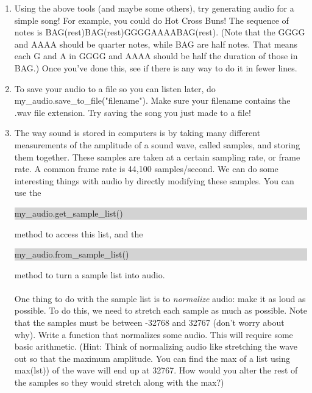\documentclass[11pt, letterpaper, onecolumn, oneside, final]{article}
\begin{document}
\begin{enumerate}
\item Using the above tools (and maybe some others), try generating audio for a simple song! For example, you could do Hot Cross Buns! The sequence of notes is BAG(rest)BAG(rest)GGGGAAAABAG(rest). (Note that the GGGG and AAAA should be quarter notes, while BAG are half notes. That means each G and A in GGGG and AAAA should be half the duration of those in BAG.) Once you've done this, see if there is any way to do it in fewer lines.

\item To save your audio to a file so you can listen later, do {\consolas my\_audio.save\_to\_file("filename")}. Make sure your filename contains the {\consolas .wav} file extension. Try saving the song you just made to a file!

\item The way sound is stored in computers is by taking many different measurements of the amplitude of a sound wave, called samples, and storing them together. These samples are taken at a certain sampling rate, or frame rate. A common frame rate is 44,100 samples/second. We can do some interesting things with audio by directly modifying these samples. You can use the
\begin{center}\colorbox{lightgray}{\parbox{.33\textwidth}{\consolas my\_audio.get\_sample\_list()}}
\end{center}
method to access this list, and the 
\begin{center}
\colorbox{lightgray}{\parbox{.345\textwidth}{\consolas my\_audio.from\_sample\_list()}}
\end{center}
method to turn a sample list into audio. \\
\\
One thing to do with the sample list is to \emph{normalize} audio: make it as loud as possible. To do this, we need to stretch each sample as much as possible. Note that the samples must be between -32768 and 32767 (don't worry about why). Write a function that normalizes some audio. This will require some basic arithmetic. (Hint: Think of normalizing audio like stretching the wave out so that the maximum amplitude. You can find the max of a list using {\consolas max(lst)}) of the wave will end up at 32767. How would you alter the rest of the samples so they would stretch along with the max?)


\end{enumerate}
\end{document}
